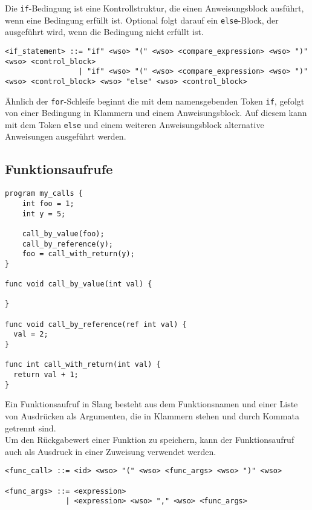 Die \texttt{if}-Bedingung ist eine Kontrollstruktur, die einen Anweisungsblock ausführt, wenn eine Bedingung erfüllt ist.
Optional folgt darauf ein \texttt{else}-Block, der ausgeführt wird, wenn die Bedingung nicht erfüllt ist.

\begin{lstlisting}[caption={Grammatikdefinition if-Bedingung}]
<if_statement> ::= "if" <wso> "(" <wso> <compare_expression> <wso> ")" <wso> <control_block>
                 | "if" <wso> "(" <wso> <compare_expression> <wso> ")"  <wso> <control_block> <wso> "else" <wso> <control_block>
\end{lstlisting}

Ähnlich der \texttt{for}-Schleife beginnt die mit dem namensgebenden Token \texttt{if}, gefolgt von einer Bedingung in Klammern und einem Anweisungsblock.
Auf diesem kann mit dem Token \texttt{else} und einem weiteren Anweisungsblock alternative Anweisungen ausgeführt werden.

\subsection{Funktionsaufrufe}

\begin{lstlisting}[caption={Slang Beispiel Funktionsaufrufe}]
program my_calls {
    int foo = 1;
    int y = 5;
    
    call_by_value(foo);
    call_by_reference(y);
    foo = call_with_return(y);
}

func void call_by_value(int val) {
  
}

func void call_by_reference(ref int val) {
  val = 2;
}

func int call_with_return(int val) {
  return val + 1;
}
\end{lstlisting}

Ein Funktionsaufruf in Slang besteht aus dem Funktionsnamen und einer Liste von Ausdrücken als Argumenten, die in Klammern stehen und durch Kommata getrennt sind.\\
Um den Rückgabewert einer Funktion zu speichern, kann der Funktionsaufruf auch als Ausdruck in einer Zuweisung verwendet werden.

\begin{lstlisting}[caption={Grammatikdefinition Funktionsaufrufe}]
<func_call> ::= <id> <wso> "(" <wso> <func_args> <wso> ")" <wso>

<func_args> ::= <expression>
              | <expression> <wso> "," <wso> <func_args>
\end{lstlisting}

